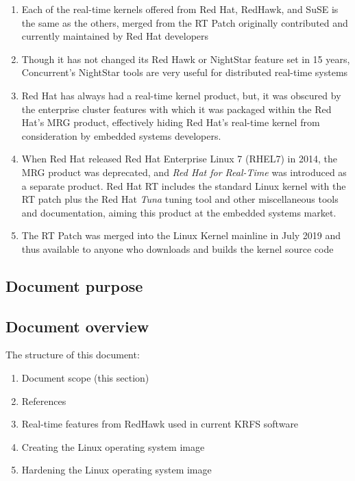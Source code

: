 \documentclass[12pt]{article}
\begin{document}
\begin{enumerate}
    \item Each of the real-time kernels offered from Red Hat, RedHawk, and SuSE
is the same as the others, merged from the RT Patch originally contributed and
currently maintained by Red Hat developers
    \item Though it has not changed its Red Hawk or NightStar feature set in 15
years, Concurrent's NightStar tools are very useful for distributed real-time
systems
    \item Red Hat has always had a real-time kernel product, but, it was
obscured by the enterprise cluster features with which it was packaged within
the Red Hat's MRG product, effectively hiding Red Hat's real-time kernel from
consideration by embedded systems developers.
    \item When Red Hat released Red Hat Enterprise Linux 7 (RHEL7) in 2014, the
MRG product was deprecated, and \emph{Red Hat for Real-Time} was introduced as a
separate product.  Red Hat RT includes the standard Linux kernel with the RT
patch plus the Red Hat \emph{Tuna} tuning tool and other miscellaneous tools and
documentation, aiming this product at the embedded systems market.
    \item The RT Patch was merged into the Linux Kernel mainline in July 2019
and thus available to anyone who downloads and builds the kernel source code
\end{enumerate}



\subsection{Document purpose}
%


\subsection{Document overview}
The structure of this document:

\begin{enumerate}
    \item Document scope (this section)
    \item References
    \item Real-time features from RedHawk used in current KRFS software
    \item Creating the Linux operating system image
    \item Hardening the Linux operating system image
\end{enumerate}
\end{document}
